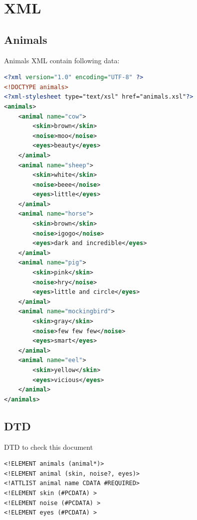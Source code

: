 \documentclass[a4paper,11pt]{article}
\theoremstyle{mytheor}
\begin{document}
\section{XML}

\addtocounter{subsection}{3}
\subsection{Animals}

Animals XML contain following data:

\begin{lstlisting}[language=xml]
<?xml version="1.0" encoding="UTF-8" ?>
<!DOCTYPE animals>
<?xml-stylesheet type="text/xsl" href="animals.xsl"?>
<animals>
    <animal name="cow">
        <skin>brown</skin>
        <noise>moo</noise>
        <eyes>beauty</eyes>
    </animal>
    <animal name="sheep">
        <skin>white</skin>
        <noise>beee</noise>
        <eyes>little</eyes>
    </animal>
    <animal name="horse">
        <skin>brown</skin>
        <noise>igogo</noise>
        <eyes>dark and incredible</eyes>
    </animal>
    <animal name="pig">
        <skin>pink</skin>
        <noise>hry</noise>
        <eyes>little and circle</eyes>
    </animal>
    <animal name="mockingbird">
        <skin>gray</skin>
        <noise>few few few</noise>
        <eyes>smart</eyes>
    </animal>
    <animal name="eel">
        <skin>yellow</skin>
        <eyes>vicious</eyes>
    </animal>
</animals>
\end{lstlisting}
\addtocounter{subsection}{1}
\subsection{DTD}
DTD to check this document

\begin{lstlisting}
<!ELEMENT animals (animal*)>
<!ELEMENT animal (skin, noise?, eyes)>
<!ATTLIST animal name CDATA #REQUIRED>
<!ELEMENT skin (#PCDATA) >
<!ELEMENT noise (#PCDATA) >
<!ELEMENT eyes (#PCDATA) >
\end{lstlisting}
\end{document}
